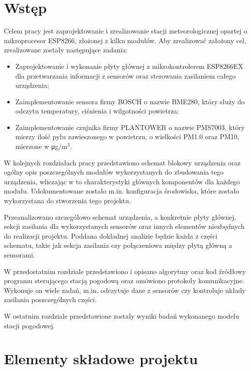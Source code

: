 \documentclass[12pt,a4paper,oneside]{memoir}
\begin{document}
\chapter{Wstęp}
	\hspace{\parindent} Celem pracy jest zaprojektowanie i zrealizowanie stacji meteorologicznej opartej o mikroprocesor ESP8266, złożonej z kilku modułów. Aby zrealizować założony cel, zrealizowane zostały następujące zadania:
	\begin{itemize}{}{}
		\item Zaprojektowanie i wykonanie płyty głównej z mikrokontrolerem ESP8266EX dla przetwarzania informacji z sensorów oraz sterowania zasilaniem całego urządzenia;
		\item Zaimplementowanie sensora firmy BOSCH o nazwie BME280, który służy do odczytu temperatury, ciśnienia i wilgotności powietrza;
		\item Zaimplementowanie czujnika firmy PLANTOWER o nazwie PMS7003, który mierzy ilość pyłu zawieszonego w powietrzu, o wielkości PM1.0 oraz PM10, mierzone w \si\micro g/m$^{3}$.
	\end{itemize}
	\par W kolejnych rozdziałach pracy przedstawiono schemat blokowy urządzenia oraz ogólny opis poszczególnych modułów wykorzystanych do zbudowania tego urządzenia, wliczając w to charakterystyki głównych komponentów dla każdego modułu. Udokumentowane zostało m.in. konfiguracja środowiska, które zostało wykorzystana do stworzenia tego projektu.
	\par Przeanalizowano szczegółowo schemat urządzenia, a konkretnie płyty głównej, sekcji zasilania dla wykorzystanych sensorów oraz innych elementów niezbędnych do realizacji projektu. Poddana dokładnej analizie będzie każda z części schematu, takie jak sekcja zasilania czy połączeniowa między płytą główną a sensorami.
	\par  W przedostatnim rozdziale przedstawiono i opisano algorytmy oraz kod źródłowy programu sterującego stacją pogodową oraz omówiono protokoły komunikacyjne. Wykonuje on wiele zadań, m.in. odczytuje dane z sensorów czy kontroluje układy zasilania poszczególnych części.
	\par W ostatnim rozdziale przedstawione zostały wyniki badań wykonanego modelu stacji pogodowej.

\chapter{Elementy składowe projektu} 
\end{document}

